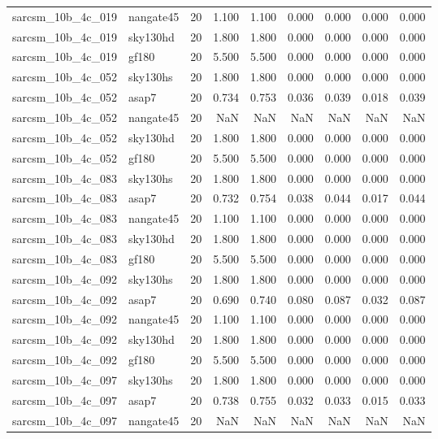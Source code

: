 \begin{tabular}{llrrrrrrr}
sarcsm\_10b\_4c\_019 & nangate45 & 20 & 1.100 & 1.100 & 0.000 & 0.000 & 0.000 & 0.000 \\
sarcsm\_10b\_4c\_019 & sky130hd & 20 & 1.800 & 1.800 & 0.000 & 0.000 & 0.000 & 0.000 \\
sarcsm\_10b\_4c\_019 & gf180 & 20 & 5.500 & 5.500 & 0.000 & 0.000 & 0.000 & 0.000 \\
sarcsm\_10b\_4c\_052 & sky130hs & 20 & 1.800 & 1.800 & 0.000 & 0.000 & 0.000 & 0.000 \\
sarcsm\_10b\_4c\_052 & asap7 & 20 & 0.734 & 0.753 & 0.036 & 0.039 & 0.018 & 0.039 \\
sarcsm\_10b\_4c\_052 & nangate45 & 20 & NaN & NaN & NaN & NaN & NaN & NaN \\
sarcsm\_10b\_4c\_052 & sky130hd & 20 & 1.800 & 1.800 & 0.000 & 0.000 & 0.000 & 0.000 \\
sarcsm\_10b\_4c\_052 & gf180 & 20 & 5.500 & 5.500 & 0.000 & 0.000 & 0.000 & 0.000 \\
sarcsm\_10b\_4c\_083 & sky130hs & 20 & 1.800 & 1.800 & 0.000 & 0.000 & 0.000 & 0.000 \\
sarcsm\_10b\_4c\_083 & asap7 & 20 & 0.732 & 0.754 & 0.038 & 0.044 & 0.017 & 0.044 \\
sarcsm\_10b\_4c\_083 & nangate45 & 20 & 1.100 & 1.100 & 0.000 & 0.000 & 0.000 & 0.000 \\
sarcsm\_10b\_4c\_083 & sky130hd & 20 & 1.800 & 1.800 & 0.000 & 0.000 & 0.000 & 0.000 \\
sarcsm\_10b\_4c\_083 & gf180 & 20 & 5.500 & 5.500 & 0.000 & 0.000 & 0.000 & 0.000 \\
sarcsm\_10b\_4c\_092 & sky130hs & 20 & 1.800 & 1.800 & 0.000 & 0.000 & 0.000 & 0.000 \\
sarcsm\_10b\_4c\_092 & asap7 & 20 & 0.690 & 0.740 & 0.080 & 0.087 & 0.032 & 0.087 \\
sarcsm\_10b\_4c\_092 & nangate45 & 20 & 1.100 & 1.100 & 0.000 & 0.000 & 0.000 & 0.000 \\
sarcsm\_10b\_4c\_092 & sky130hd & 20 & 1.800 & 1.800 & 0.000 & 0.000 & 0.000 & 0.000 \\
sarcsm\_10b\_4c\_092 & gf180 & 20 & 5.500 & 5.500 & 0.000 & 0.000 & 0.000 & 0.000 \\
sarcsm\_10b\_4c\_097 & sky130hs & 20 & 1.800 & 1.800 & 0.000 & 0.000 & 0.000 & 0.000 \\
sarcsm\_10b\_4c\_097 & asap7 & 20 & 0.738 & 0.755 & 0.032 & 0.033 & 0.015 & 0.033 \\
sarcsm\_10b\_4c\_097 & nangate45 & 20 & NaN & NaN & NaN & NaN & NaN & NaN \\

\end{tabular}

